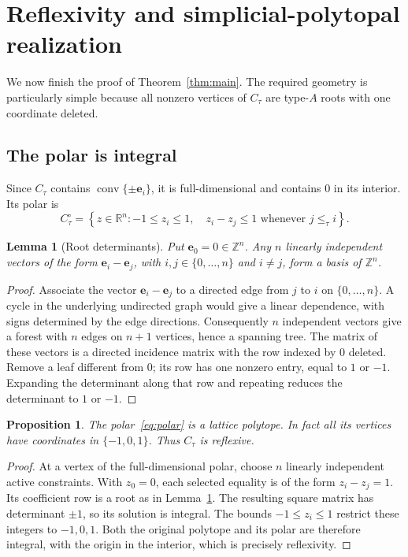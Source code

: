 \documentclass[11pt]{article}
\numberwithin{equation}{section}
\newtheorem{lemma}[theorem]{Lemma}
\newtheorem{proposition}[theorem]{Proposition}
\theoremstyle{definition}
\newcommand{\R}{\mathbb R}
\newcommand{\Z}{\mathbb Z}
\newcommand{\conv}{\operatorname{conv}}
\newcommand{\ee}{\mathbf e}
\begin{document}
\section{Reflexivity and simplicial-polytopal realization}\label{sec:polytopal}

We now finish the proof of Theorem~\ref{thm:main}. The required geometry is
particularly simple because all nonzero vertices of $C_\tau$ are type-$A$
roots with one coordinate deleted.

\subsection{The polar is integral}

Since $C_\tau$ contains $\conv\{\pm\ee_i\}$, it is full-dimensional and contains
$0$ in its interior. Its polar is
\begin{equation}
 C_\tau^\circ=\left\{z\in\R^n:
 -1\leq z_i\leq1,\quad z_i-z_j\leq1\text{ whenever }j\leq_\tau i\right\}.
 \label{eq:polar}
\end{equation}

\begin{lemma}[Root determinants]\label{lem:determinant}
Put $\ee_0=0\in\Z^n$. Any $n$ linearly independent vectors of the form
$\ee_i-\ee_j$, with $i,j\in\{0,\ldots,n\}$ and $i\ne j$, form a basis of
$\Z^n$.
\end{lemma}
\begin{proof}
Associate the vector $\ee_i-\ee_j$ to a directed edge from $j$ to $i$ on
$\{0,\ldots,n\}$. A cycle in the underlying undirected graph would give a
linear dependence, with signs determined by the edge directions. Consequently
$n$ independent vectors give a forest with $n$ edges on $n+1$ vertices, hence a
spanning tree. The matrix of these vectors is a directed incidence matrix with
the row indexed by $0$ deleted. Remove a leaf different from $0$; its row has
one nonzero entry, equal to $1$ or $-1$. Expanding the determinant along that
row and repeating reduces the determinant to $1$ or $-1$.
\end{proof}

\begin{proposition}\label{prop:reflexive}
The polar~\eqref{eq:polar} is a lattice polytope. In fact all its vertices have
coordinates in $\{-1,0,1\}$. Thus $C_\tau$ is reflexive.
\end{proposition}
\begin{proof}
At a vertex of the full-dimensional polar, choose $n$ linearly independent
active constraints. With $z_0=0$, each selected equality is of the form
$z_i-z_j=1$. Its coefficient row is a root as in
Lemma~\ref{lem:determinant}. The resulting square matrix has determinant
$\pm1$, so its solution is integral. The bounds $-1\leq z_i\leq1$ restrict
these integers to $-1,0,1$. Both the original polytope and its polar are
therefore integral, with the origin in the interior, which is precisely
reflexivity.
\end{proof}
\end{document}
